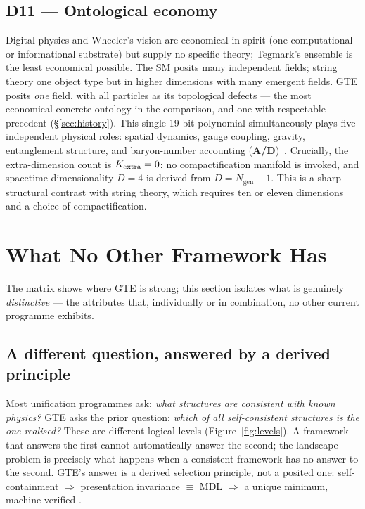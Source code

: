 \documentclass[11pt]{article}
\newcommand{\Ngen}{\ensuremath{N_{\mathrm{gen}}}}
\newcommand{\CatAD}{\textbf{A/D}}
\begin{document}
\subsection*{D11 --- Ontological economy}
Digital physics and Wheeler's vision are economical in spirit (one computational or
informational substrate) but supply no specific theory; Tegmark's ensemble is the
least economical possible.  The SM posits many independent fields; string theory
one object type but in higher dimensions with many emergent fields.  GTE posits
\emph{one} field, with all particles as its topological defects --- the most
economical concrete ontology in the comparison, and one with respectable
precedent (§\ref{sec:history}).  This single 19-bit polynomial simultaneously
plays five independent physical roles: spatial dynamics, gauge coupling, gravity,
entanglement structure, and baryon-number accounting (\CatAD)~\cite{SpivackGTEPolynomialUFT}.
Crucially, the extra-dimension count is $K_{\rm extra}=0$: no compactification manifold
is invoked, and spacetime dimensionality $D=4$ is derived from $D = \Ngen + 1$.
This is a sharp structural contrast with string theory, which requires ten or
eleven dimensions and a choice of compactification.

\section{What No Other Framework Has}
\label{sec:unique}

The matrix shows where GTE is strong; this section isolates what is genuinely
\emph{distinctive} --- the attributes that, individually or in combination, no
other current programme exhibits.

\subsection{A different question, answered by a derived principle}

Most unification programmes ask: \emph{what structures are consistent with known
physics?}  GTE asks the prior question: \emph{which of all self-consistent
structures is the one realised?}  These are different logical levels
(Figure~\ref{fig:levels}).  A framework that answers the first cannot automatically
answer the second; the landscape problem is precisely what happens when a
consistent framework has no answer to the second.  GTE's answer is a derived
selection principle, not a posited one: self-containment $\Rightarrow$ presentation
invariance $\equiv$ MDL $\Rightarrow$ a unique minimum, machine-verified
\cite{SpivackNEMS05,SpivackGTEPolynomialWolfram}.
\end{document}
